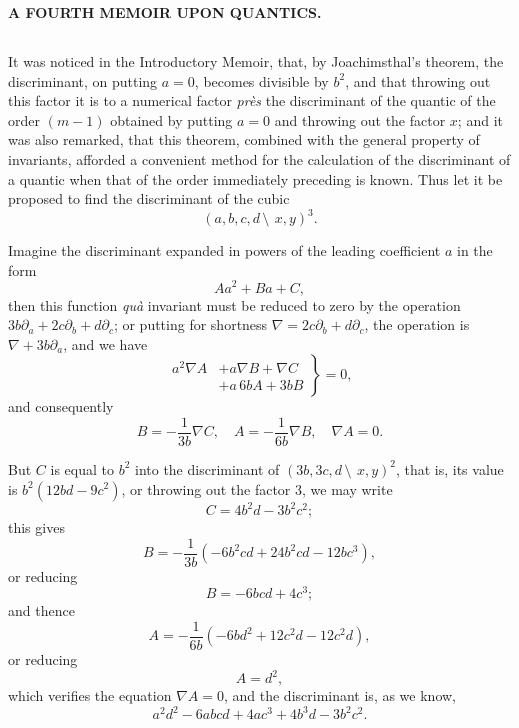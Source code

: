\documentclass[11pt,a4paper]{book}
\begin{document}
\begin{center}
\begin{center}
\Large\textbf{A FOURTH MEMOIR UPON QUANTICS.}
\end{center}

\setcounter{subsection}{80}

\subsection{}

It was noticed in the Introductory Memoir, that, by Joachimsthal's theorem, the discriminant, on putting $a = 0$, becomes divisible by $b^2$, and that throwing out this factor it is to a numerical factor \textit{pr\`es} the discriminant of the quantic of the order $(m-1)$ obtained by putting $a = 0$ and throwing out the factor $x$; and it was also remarked, that this theorem, combined with the general property of invariants, afforded a convenient method for the calculation of the discriminant of a quantic when that of the order immediately preceding is known. Thus let it be proposed to find the discriminant of the cubic
\[
(a, b, c, d\,\setminus\!\!\:\, x, y)^3.
\]

Imagine the discriminant expanded in powers of the leading coefficient $a$ in the form
\[
Aa^2 + Ba + C,
\]
then this function \textit{qu\`a} invariant must be reduced to zero by the operation $3b\partial_a + 2c\partial_b + d\partial_c$; or putting for shortness $\nabla = 2c\partial_b + d\partial_c$, the operation is $\nabla + 3b\partial_a$, and we have
\[
\left.\begin{aligned}
a^2 \nabla A &+ a\nabla B + \nabla C\\
&+ a\, 6bA + 3bB
\end{aligned}\right\} = 0,
\]
and consequently
\[
B = -\frac{1}{3b}\nabla C, \quad A = -\frac{1}{6b}\nabla B, \quad \nabla A = 0.
\]

But $C$ is equal to $b^2$ into the discriminant of $(3b, 3c, d\,\setminus\!\!\:\, x, y)^2$, that is, its value is $b^2(12bd - 9c^2)$, or throwing out the factor $3$, we may write
\[
C = 4b^2d - 3b^2c^2;
\]
this gives
\[
B = -\frac{1}{3b}(-6b^2cd + 24b^2cd - 12bc^3),
\]
or reducing
\[
B = -6bcd + 4c^3;
\]
and thence
\[
A = -\frac{1}{6b}(-6bd^2 + 12c^2d - 12c^2d),
\]
or reducing
\[
A = d^2,
\]
which verifies the equation $\nabla A = 0$, and the discriminant is, as we know,
\[
a^2d^2 - 6abcd + 4ac^3 + 4b^3d - 3b^2c^2.
\]

\subsection{}


\end{center}
\end{document}

